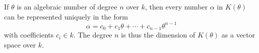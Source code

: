 If $\theta$ is an algebraic number of degree $n$ over $k$, then every number $\alpha$ in $K(\theta)$ can be represented uniquely in the form
$$\alpha = c_0 + c_1 \theta + \cdots + c_{n-1} \theta^{n-1}$$
with coefficients $c_i \in k$. The degree $n$ is thus the dimension of $K(\theta)$ as a vector space over $k$.
